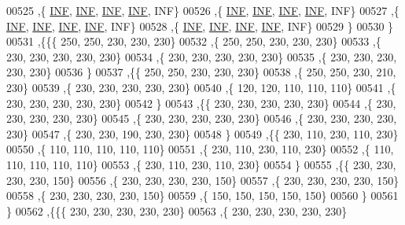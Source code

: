 \begin{DoxyCode}
00525    ,\{   \hyperlink{energy__const_8h_a12c2040f25d8e3a7b9e1c2024c618cb6}{INF},   \hyperlink{energy__const_8h_a12c2040f25d8e3a7b9e1c2024c618cb6}{INF},   \hyperlink{energy__const_8h_a12c2040f25d8e3a7b9e1c2024c618cb6}{INF},   \hyperlink{energy__const_8h_a12c2040f25d8e3a7b9e1c2024c618cb6}{INF},   INF\}
00526    ,\{   \hyperlink{energy__const_8h_a12c2040f25d8e3a7b9e1c2024c618cb6}{INF},   \hyperlink{energy__const_8h_a12c2040f25d8e3a7b9e1c2024c618cb6}{INF},   \hyperlink{energy__const_8h_a12c2040f25d8e3a7b9e1c2024c618cb6}{INF},   \hyperlink{energy__const_8h_a12c2040f25d8e3a7b9e1c2024c618cb6}{INF},   INF\}
00527    ,\{   \hyperlink{energy__const_8h_a12c2040f25d8e3a7b9e1c2024c618cb6}{INF},   \hyperlink{energy__const_8h_a12c2040f25d8e3a7b9e1c2024c618cb6}{INF},   \hyperlink{energy__const_8h_a12c2040f25d8e3a7b9e1c2024c618cb6}{INF},   \hyperlink{energy__const_8h_a12c2040f25d8e3a7b9e1c2024c618cb6}{INF},   INF\}
00528    ,\{   \hyperlink{energy__const_8h_a12c2040f25d8e3a7b9e1c2024c618cb6}{INF},   \hyperlink{energy__const_8h_a12c2040f25d8e3a7b9e1c2024c618cb6}{INF},   \hyperlink{energy__const_8h_a12c2040f25d8e3a7b9e1c2024c618cb6}{INF},   \hyperlink{energy__const_8h_a12c2040f25d8e3a7b9e1c2024c618cb6}{INF},   INF\}
00529    \}
00530   \}
00531  ,\{\{\{   250,   250,   230,   230,   230\}
00532    ,\{   250,   250,   230,   230,   230\}
00533    ,\{   230,   230,   230,   230,   230\}
00534    ,\{   230,   230,   230,   230,   230\}
00535    ,\{   230,   230,   230,   230,   230\}
00536    \}
00537   ,\{\{   250,   250,   230,   230,   230\}
00538    ,\{   250,   250,   230,   210,   230\}
00539    ,\{   230,   230,   230,   230,   230\}
00540    ,\{   120,   120,   110,   110,   110\}
00541    ,\{   230,   230,   230,   230,   230\}
00542    \}
00543   ,\{\{   230,   230,   230,   230,   230\}
00544    ,\{   230,   230,   230,   230,   230\}
00545    ,\{   230,   230,   230,   230,   230\}
00546    ,\{   230,   230,   230,   230,   230\}
00547    ,\{   230,   230,   190,   230,   230\}
00548    \}
00549   ,\{\{   230,   110,   230,   110,   230\}
00550    ,\{   110,   110,   110,   110,   110\}
00551    ,\{   230,   110,   230,   110,   230\}
00552    ,\{   110,   110,   110,   110,   110\}
00553    ,\{   230,   110,   230,   110,   230\}
00554    \}
00555   ,\{\{   230,   230,   230,   230,   150\}
00556    ,\{   230,   230,   230,   230,   150\}
00557    ,\{   230,   230,   230,   230,   150\}
00558    ,\{   230,   230,   230,   230,   150\}
00559    ,\{   150,   150,   150,   150,   150\}
00560    \}
00561   \}
00562  ,\{\{\{   230,   230,   230,   230,   230\}
00563    ,\{   230,   230,   230,   230,   230\}

\end{DoxyCode}
